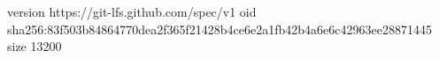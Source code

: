 version https://git-lfs.github.com/spec/v1
oid sha256:83f503b84864770dea2f365f21428b4ce6e2a1fb42b4a6e6c42963ee28871445
size 13200

